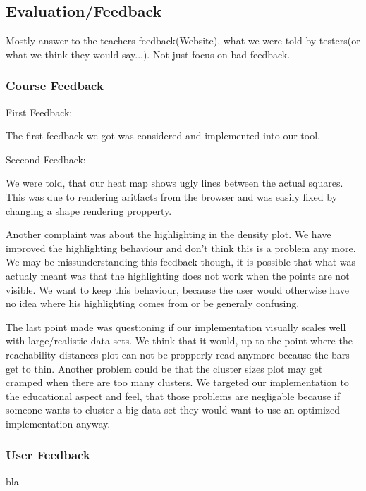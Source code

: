 \documentclass{vgtc}                          %
\begin{document}
\subsection{Evaluation/Feedback}
Mostly answer to the teachers feedback(Website), what we were told by testers(or what we think they would say...). Not just focus on bad feedback.
\subsubsection{Course Feedback}
\begin{flushleft}
First Feedback:
\end{flushleft}
\begin{flushleft}
The first feedback we got was considered and implemented into our tool.
\end{flushleft}
\begin{flushleft}
Seccond Feedback:
\end{flushleft}
\begin{flushleft}
We were told, that our heat map shows ugly lines between the actual squares. This was due to rendering aritfacts from the browser and was easily fixed by changing a shape rendering propperty.
\end{flushleft}
\begin{flushleft}
Another complaint was about the highlighting in the density plot. We have improved the highlighting behaviour and don't think this is a problem any more. We may be missunderstanding this feedback though, it is possible that what was actualy meant was that the highlighting does not work when the points are not visible. We want to keep this behaviour, because the user would otherwise have no idea where his highlighting comes from or be generaly confusing.
\end{flushleft}
\begin{flushleft}
The last point made was questioning if our implementation visually scales well with large/realistic data sets. We think that it would, up to the point where the reachability distances plot can not be propperly read anymore because the bars get to thin. Another problem could be that the cluster sizes plot may get cramped when there are too many clusters. We targeted our implementation to the educational aspect and feel, that those problems are negligable because if someone wants to cluster a big data set they would want to use an optimized implementation anyway.
\end{flushleft}
\subsubsection{User Feedback}
bla
\end{document}
